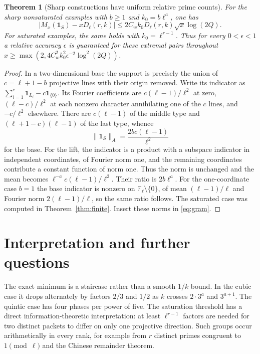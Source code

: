\documentclass[11pt]{article}
\newtheorem{theorem}{Theorem}[section]
\theoremstyle{remark}\newtheorem{remark}[theorem]{Remark}
\newcommand{\F}{\mathbb F}
\newcommand{\one}{\mathbf 1}
\begin{document}
\begin{theorem}[Sharp constructions have uniform relative prime counts]\label{thm:counts}
For the sharp nonsaturated examples with $b\ge1$ and $k_0=b\ell^a$, one has
\begin{equation}\label{eq:relative}
|M_x(\one_S)-xD_\ell(r,k)|\le 2C_w k_0D_\ell(r,k)\sqrt{x}\log(2Q).
\end{equation}
For saturated examples, the same holds with $k_0=\ell^{r-1}$. Thus for every $0<\epsilon<1$ a relative accuracy $\epsilon$ is guaranteed for these extremal pairs throughout $x\ge\max(2,4C_w^2 k_0^2\epsilon^{-2}\log^2(2Q))$.
\end{theorem}
\begin{proof}
In a two-dimensional base the support is precisely the union of $c=\ell+1-b$ projective lines with their origin removed. Write its indicator as $\sum_{i=1}^c\one_{L_i}-c\one_{\{0\}}$. Its Fourier coefficients are $c(\ell-1)/\ell^2$ at zero, $(\ell-c)/\ell^2$ at each nonzero character annihilating one of the $c$ lines, and $-c/\ell^2$ elsewhere. There are $c(\ell-1)$ of the middle type and $(\ell+1-c)(\ell-1)$ of the last type, whence
\[
\|\one_S\|_A=\frac{2bc(\ell-1)}{\ell^2}
\]
for the base. For the lift, the indicator is a product with a subspace indicator in independent coordinates, of Fourier norm one, and the remaining coordinates contribute a constant function of norm one. Thus the norm is unchanged and the mean becomes $\ell^{-a}c(\ell-1)/\ell^2$. Their ratio is $2b\ell^a$. For the one-coordinate case $b=1$ the base indicator is nonzero on $\F_\ell\setminus\{0\}$, of mean $(\ell-1)/\ell$ and Fourier norm $2(\ell-1)/\ell$, so the same ratio follows. The saturated case was computed in Theorem~\ref{thm:finite}. Insert these norms in \eqref{eq:gram}.
\end{proof}

\section{Interpretation and further questions}
The exact minimum is a staircase rather than a smooth $1/k$ bound. In the cubic case it drops alternately by factors $2/3$ and $1/2$ as $k$ crosses $2\cdot3^a$ and $3^{a+1}$. The quintic case has four phases per power of five. The saturation threshold has a direct information-theoretic interpretation: at least $\ell^{r-1}$ factors are needed for two distinct packets to differ on only one projective direction. Such groups occur arithmetically in every rank, for example from $r$ distinct primes congruent to $1\pmod\ell$ and the Chinese remainder theorem.
\end{document}
